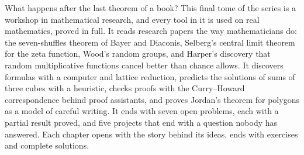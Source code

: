 What happens after the last theorem of a book? This final tome of the series is a workshop in mathematical research,
and every tool in it is used on real mathematics, proved in full. It reads research papers the way mathematicians do:
the seven-shuffles theorem of Bayer and Diaconis, Selberg's central limit theorem for the zeta function, Wood's random
groups, and Harper's discovery that random multiplicative functions cancel better than chance allows. It discovers
formulas with a computer and lattice reduction, predicts the solutions of sums of three cubes with a heuristic, checks
proofs with the Curry--Howard correspondence behind proof assistants, and proves Jordan's theorem for polygons as a model
of careful writing. It ends with seven open problems, each with a partial result proved, and five projects that end
with a question nobody has answered. Each chapter opens with the story behind its ideas, ends with exercises and
complete solutions.
